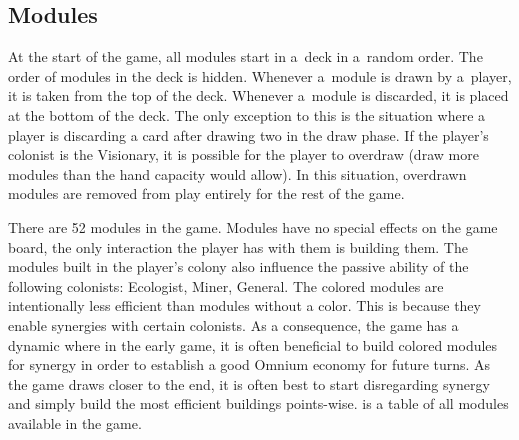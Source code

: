 \clearpage
\subsection{Modules}
\label{de:modules}

At the start of the game, all modules start in a~deck in a~random order.
The order of modules in the deck is hidden. Whenever a~module is drawn by
a~player, it is taken from the top of the deck. Whenever a~module is discarded, it
is placed at the bottom of the deck. The only exception to this is the situation where
a player is discarding a card after drawing two in the draw phase. If the player's
colonist is the Visionary, it is possible for the player to overdraw (draw more modules
than the hand capacity would allow). In this situation, overdrawn modules are removed
from play entirely for the rest of the game.

There are 52 modules in the game. Modules have no special effects on the game board,
the only interaction the player has with them is building them.
The modules built in the player's colony also influence the passive ability
of the following colonists: Ecologist, Miner, General. The colored modules
are intentionally less efficient than modules without a color. This is because
they enable synergies with certain colonists. As a consequence, the game has a dynamic
where in the early game, it is often beneficial to build colored modules for synergy
in order to establish a good Omnium economy for future turns. As the game draws closer
to the end, it is often best to start disregarding synergy and simply build the most
efficient buildings points-wise.
 is a table of all modules available in the game.

